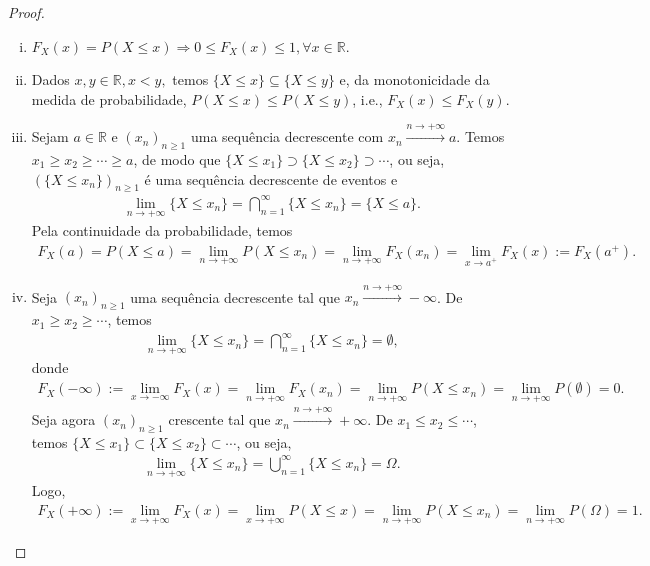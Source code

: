 \documentclass[../Notas.tex]{subfiles}
\begin{document}
\begin{proof}
\begin{enumerate}[(i)]
    \item $F_X(x) = P(X\leq x) \Rightarrow 0\leq F_X(x) \leq 1, \forall x\in\mathbb{R}$.
    \item Dados $x,y\in\mathbb{R}, x<y,$ temos $\{X\leq x\} \subseteq \{X\leq y\}$ e, da monotonicidade da medida de probabilidade, $P(X\leq x)\leq P(X\leq y)$, i.e., $F_X(x)\leq F_X(y)$.
    \item Sejam $a\in\mathbb{R}$ e $(x_n)_{n\geq 1}$ uma sequência decrescente com $x_n \xrightarrow{n\to +\infty} a$. Temos $x_1\geq x_2\geq\cdots\geq a$, de modo que $\{X\leq x_1\}\supset\{X\leq x_2\}\supset\cdots$, ou seja, $(\{X\leq x_n\})_{n\geq 1}$ é uma sequência decrescente de eventos e
    \begin{align*}
        \lim_{n\to +\infty}\{X\leq x_n\} = \bigcap_{n=1}^{\infty}\{X\leq x_n\} = \{X\leq a\}.
    \end{align*}
    Pela continuidade da probabilidade, temos
    \begin{align*}
        F_X(a) = P(X\leq a) = \lim_{n\to +\infty}P(X\leq x_n) = \lim_{n\to +\infty} F_X(x_n) = \lim_{x\to a^+}F_X(x) := F_X(a^+).
    \end{align*}
    \item Seja $(x_n)_{n\geq 1}$ uma sequência decrescente tal que $x_n\xrightarrow{n\to +\infty} -\infty$. De $x_1\geq x_2\geq\cdots$, temos
    \begin{align*}
        \lim_{n\to +\infty}\{X\leq x_n\} = \bigcap_{n=1}^{\infty}\{X\leq x_n\} = \emptyset,
    \end{align*}
    donde
    \begin{align*}
        F_X(-\infty) := \lim_{x\to -\infty}F_X(x) = \lim_{n\to +\infty} F_X(x_n) = \lim_{n\to +\infty}P(X\leq x_n) = \lim_{n\to +\infty}P(\emptyset) = 0.
    \end{align*}
    Seja agora $(x_n)_{n\geq 1}$ crescente tal que $x_n\xrightarrow{n\to +\infty} +\infty$. De $x_1\leq x_2\leq\cdots$, temos $\{X\leq x_1\}\subset\{X\leq x_2\}\subset\cdots$, ou seja, 
    \begin{align*}
        \lim_{n\to +\infty}\{X\leq x_n\} = \bigcup_{n=1}^{\infty}\{X\leq x_n\} = \Omega.
    \end{align*}
    Logo, 
    \begin{align*}
        F_X(+\infty) := \lim_{x\to +\infty}F_X(x) = \lim_{x\to +\infty}P(X\leq x) = \lim_{n\to +\infty}P(X\leq x_n) = \lim_{n\to +\infty} P(\Omega) = 1.
    \end{align*}
\end{enumerate}
\end{proof}
\end{document}
